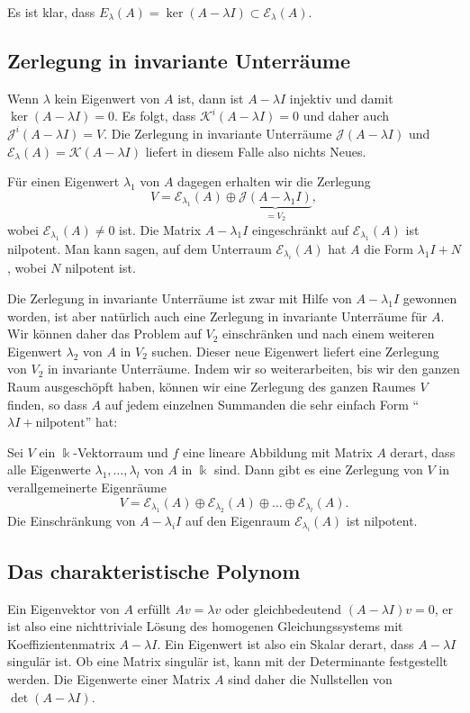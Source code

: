 Es ist klar, dass
$E_\lambda(A)=\ker (A-\lambda I)\subset\mathcal{E}_{\lambda}(A)$.

\subsection{Zerlegung in invariante Unterräume
\label{buch:subsection:zerlegung-in-invariante-unterraeume}}
Wenn $\lambda$ kein Eigenwert von $A$ ist, dann ist $A-\lambda I$
injektiv und damit $\ker(A-\lambda I)=0$.
Es folgt, dass $\mathcal{K}^i(A-\lambda I)=0$ und daher auch
$\mathcal{J}^i(A-\lambda I)=V$.
Die Zerlegung in invariante Unterräume $\mathcal{J}(A-\lambda I)$ und
$\mathcal{E}_\lambda(A)=\mathcal{K}(A-\lambda I)$ liefert in diesem Falle also nichts Neues.

Für einen Eigenwert $\lambda_1$ von $A$ dagegen erhalten wir die Zerlegung
\[
V
=
\mathcal{E}_{\lambda_1}(A)
\oplus
\underbrace{\mathcal{J}(A-\lambda_1 I)}_{\displaystyle =V_2},
\]
wobei $\mathcal{E}_{\lambda_1}(A)\ne 0$ ist.
Die Matrix $A-\lambda_1 I$ eingeschränkt auf $\mathcal{E}_{\lambda_1}(A)$ ist
nilpotent.
Man kann sagen, auf dem Unterraum $\mathcal{E}_{\lambda_i}(A)$ hat 
$A$ die Form $\lambda_1 I + N$, wobei $N$ nilpotent ist.

Die Zerlegung in invariante Unterräume ist zwar mit Hilfe von $A-\lambda_1I$
gewonnen worden, ist aber natürlich auch eine Zerlegung in invariante 
Unterräume für $A$.
Wir können daher das Problem auf $V_2$ einschränken und nach einem weiteren
Eigenwert $\lambda_2$ von $A$ in $V_2$ suchen.
Dieser neue Eigenwert liefert eine Zerlegung von $V_2$
in invariante Unterräume.
Indem wir so weiterarbeiten, bis wir den ganzen Raum ausgeschöpft haben,
können wir eine Zerlegung des ganzen Raumes $V$ finden, so dass $A$ auf
jedem einzelnen Summanden die sehr einfach Form
``$\lambda I + \text{nilpotent}$'' hat:

\begin{satz}
\label{buch:eigenwerte:satz:zerlegung-in-eigenraeume}
Sei $V$ ein $\Bbbk$-Vektorraum und $f$ eine lineare Abbildung mit Matrix
$A$ derart, dass alle Eigenwerte $\lambda_1,\dots,\lambda_l$ von $A$
in $\Bbbk$ sind.
Dann gibt es eine Zerlegung von $V$ in verallgemeinerte Eigenräume
\[
V
=
\mathcal{E}_{\lambda_1}(A)
\oplus
\mathcal{E}_{\lambda_2}(A)
\oplus
\dots
\oplus
\mathcal{E}_{\lambda_l}(A).
\]
Die Einschränkung von $A-\lambda_{i}I$ auf den Eigenraum 
$\mathcal{E}_{\lambda_i}(A)$ ist nilpotent.
\end{satz}

\subsection{Das charakteristische Polynom
\label{buch:subsection:das-charakteristische-polynom}}
Ein Eigenvektor von $A$ erfüllt $Av=\lambda v$ oder gleichbedeutend
$(A-\lambda I)v=0$, er ist also eine nichttriviale Lösung des homogenen
Gleichungssystems mit Koeffizientenmatrix $A-\lambda I$. 
Ein Eigenwert ist also ein Skalar derart, dass $A-\lambda I$
singulär ist.
Ob eine Matrix singulär ist, kann mit der Determinante festgestellt
werden.
Die Eigenwerte einer Matrix $A$ sind daher die Nullstellen
von $\det(A-\lambda I)$.

